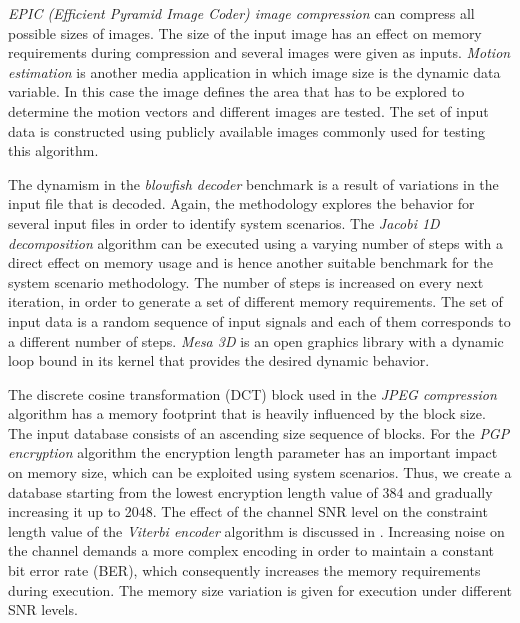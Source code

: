 \textit{EPIC (Efficient Pyramid Image Coder) image compression} can compress all possible sizes of images. 
The size of the input image has an effect on memory requirements during compression and several images were given as inputs. 
\textit{Motion estimation} is another media application in which image size is the dynamic data variable. 
In this case the image defines the area that has to be explored to determine the motion vectors and different images are tested. 
The set of input data is constructed using publicly available images commonly used for testing this algorithm.

The dynamism in the \textit{blowfish decoder} benchmark is a result of variations in the input file that is decoded. 
Again, the methodology explores the behavior for several input files in order to identify system scenarios. 
The \textit{Jacobi 1D decomposition} algorithm can be executed using a varying number of steps with a direct effect on memory usage and is hence another suitable benchmark for the system scenario methodology. 
The number of steps is increased on every next iteration, in order to generate a set of different memory requirements. 
The set of input data is a random sequence of input signals and each of them corresponds to a different number of steps.
\textit{Mesa 3D} is an open graphics library with a dynamic loop bound in its kernel that provides the desired dynamic behavior. 

The discrete cosine transformation (DCT) block used in the \textit{JPEG compression} algorithm has a memory footprint that is heavily influenced by the block size. 
The input database consists of an ascending size sequence of blocks. 
For the \textit{PGP encryption} algorithm the encryption length parameter has an important impact on memory size, which can be exploited using system scenarios. 
Thus, we create a database starting from the lowest encryption length value of 384 and gradually increasing it up to 2048. 
The effect of the channel SNR level on the constraint length value of the \textit{Viterbi encoder} algorithm is discussed in \cite{Fil12}. 
Increasing noise on the channel demands a more complex encoding in order to maintain a constant bit error rate (BER), which consequently increases the memory requirements during execution. 
The memory size variation is given for execution under different SNR levels.  


